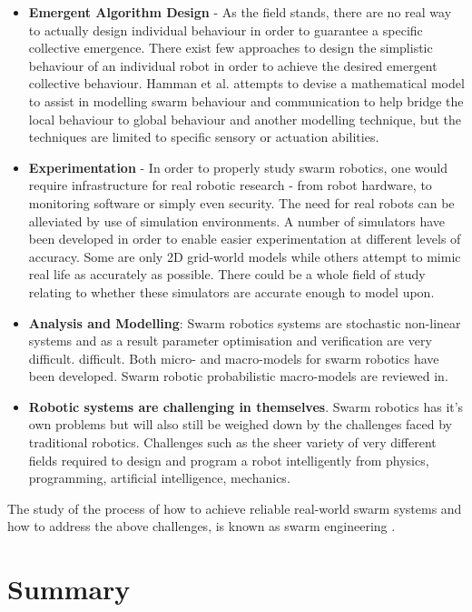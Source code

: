 \begin{itemize}

\item \textbf{Emergent Algorithm Design} - As the field stands, there are no real way to actually design individual behaviour in order to guarantee a specific collective emergence. There exist few approaches to design the simplistic behaviour of an individual robot in order to achieve the desired emergent collective behaviour. Hamman et al. attempts to devise a mathematical model to assist in modelling swarm behaviour and communication\cite{hamann2008framework} to help bridge the local behaviour to global behaviour and another modelling technique, but the techniques are limited to specific sensory or actuation abilities. 

\item \textbf{Experimentation} - In order to properly study swarm robotics, one would require infrastructure for real robotic research - from robot hardware, to monitoring software or simply even security. The need for real robots can be alleviated by use of simulation environments. A number of simulators have been developed in order to enable easier experimentation at different levels of accuracy. Some are only 2D grid-world models while others attempt to mimic real life as accurately as possible. There could be a whole field of study relating to whether these simulators are accurate enough to model upon.

\item \textbf{Analysis and Modelling}: Swarm robotics systems are stochastic non-linear systems and as a result parameter optimisation and verification are very difficult. difficult. Both micro- and macro-models for swarm robotics have been developed. Swarm robotic probabilistic macro-models are reviewed in\cite{lerman2005review}.

\item \textbf{Robotic systems are challenging in themselves}. Swarm robotics has it's own problems but will also still be weighed down by the challenges faced by traditional robotics. Challenges such as the sheer variety of very different fields required to design and program a robot intelligently from physics, programming, artificial intelligence, mechanics.
\end{itemize}


The study of the process of how to achieve reliable real-world swarm systems and how to address the above challenges, is known as swarm engineering \cite{brambilla2013swarm}. %

\section{Summary}
\label{sec:first:summary}



